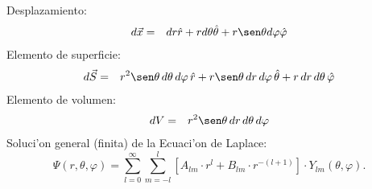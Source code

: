 Desplazamiento:
\begin{eqnarray}
 d \vec{x}
&= & dr {\hat r} + rd\theta {\hat \theta} +r\sen\theta d\varphi {\hat \varphi}
\end{eqnarray}
Elemento de superficie:
\begin{eqnarray}
 d \vec{S}
&=& r^2 \sen\theta \,d\theta \,d\varphi \, {\hat r} + r\sen\theta
\,dr\,d\varphi \, {\hat \theta} +  r\,dr\,d\theta\, {\hat \varphi}
\end{eqnarray}
Elemento de volumen:
\begin{eqnarray}
 dV
&=& r^2\sen\theta \,dr\,d\theta\, d\varphi
\end{eqnarray}
Soluci'on general (finita) de la Ecuaci'on de Laplace:
\begin{equation}
\Psi(r,\theta,\varphi) = \sum_{l=0}^\infty\sum_{m=-l}^l\left[
A_{lm}\cdot r^l + B_{lm}\cdot r^{-(l+1)}\right]\cdot Y_{lm}(\theta,\varphi).
\label{est31}
\end{equation}

